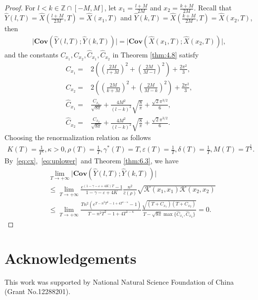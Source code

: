 \documentclass[11pt]{article}
\numberwithin{equation}{section}%
\numberwithin{figure}{section}%
\theoremstyle{remark}
\begin{document}
	\begin{proof}
		For $l<k\in\mathbb{Z}\cap[-M,M]$, let $x_{1}=\frac{l+M}{2M}$ and $x_{2}=\frac{k+M}{2M}$.
		Recall that $\hat{Y}(l,T)=\hat{X}(\frac{l+M}{2M},T)=\hat{X}(x_{1},T)$ and $\hat{Y}(k,T)=\hat{X}(\frac{k+M}{2M},T)=\hat{X}(x_{2},T)$, then
		\begin{align*}
			\vert \textbf{Cov}(\hat{Y}(l,T);\hat{Y}(k,T))\vert=\vert \textbf{Cov}(\hat{X}(x_{1},T);\hat{X}(x_{2},T))\vert,
		\end{align*}
		and the constants $C_{x_{1}},C_{x_{2}},\hat{C}_{x_{1}},\hat{C}_{x_{2}}$ in Theorem \ref{thm:4.8} satisfy 
		\begin{align*}
			C_{x_{1}}=&2\left((\frac{2M}{l+M})^{2}+(\frac{2M}{M-l})^{2}\right)+\frac{2\pi^{2}}{3},\\
			C_{x_{2}}=&2\left((\frac{2M}{k+M})^{2}+(\frac{2M}{M-k})^{2}\right)+\frac{2\pi^{2}}{3},\\
			\hat{C}_{x_{1}}=&\frac{C_{x_{1}}}{\sqrt{8\pi}}+\frac{4M^{2}}{(l-k)^{2}}\sqrt{\frac{8}{\pi}}+\frac{\sqrt{2}\pi^{3/2}}{6},\\
			\hat{C}_{x_{2}}=&\frac{C_{x_{2}}}{\sqrt{8\pi}}+\frac{4M^{2}}{(l-k)^{2}}\sqrt{\frac{8}{\pi}}+\frac{\sqrt{2}\pi^{3/2}}{6}.
		\end{align*}
		Choosing the renormalization relation as follows
		\begin{align*}
			K(T)=\frac{1}{T^{\kappa}},\kappa>0,
			\rho(T)=\frac{1}{T},\gamma^{*}(T)=T,
			\varepsilon(T)=\frac{1}{T},\delta(T)=\frac{1}{T},M(T)=T^{\frac{1}{3}}.
		\end{align*}
		By~\eqref{eq:cx},~\eqref{eq:uplower}~and Theorem \ref{thm:6.3}, we have
		\begin{align*}
			&\lim\limits_{T\rightarrow+\infty}\vert \textbf{Cov}(\hat{Y}(l,T);\hat{Y}(k,T))\vert\\
			&\leq\lim\limits_{T\rightarrow+\infty}\frac{e^{(1-\gamma-\varepsilon+4K)T}-1}{1-\gamma-\varepsilon+4K}\frac{n^{2}}{\hat{c}(\rho)}\sqrt{\mathcal{K}(x_{1},x_{1})\mathcal{K}(x_{2},x_{2})}\\
			&\leq\lim\limits_{T\rightarrow+\infty}\frac{Tn^{2}\left(e^{T-n^{2}T^{2}-1+4T^{1-\kappa}}-1\right)}{T-n^{2}T^{2}-1+4T^{1-\kappa}}\frac{\sqrt{(T+C_{x_{1}})(T+C_{x_{2}})}}{T-\sqrt{8\pi} \max\{\hat{C}_{x_{1}},\hat{C}_{x_{2}}\}}=0.
		\end{align*}
		
		
	\end{proof}
	
	\section{Acknowledgements}
	This work was supported by National Natural Science Foundation of China (Grant No.12288201).
	
\end{document}
